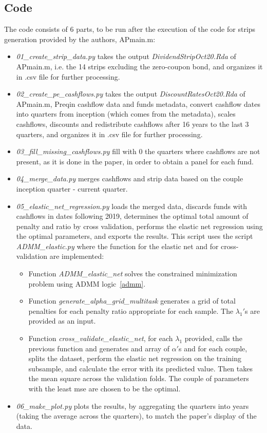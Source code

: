 \documentclass[12pt]{article}
\begin{document}
    \subsection{Code}
        The code consists of 6 parts, to be run after the execution of the code for strips generation provided by the authors, APmain.m:
        \begin{itemize}
            \item \textit{01\_create\_strip\_data.py} takes the output \textit{DividendStripOct20.Rda} of APmain.m, i.e. the 14 strips excluding the zero-coupon bond, and organizes it in .csv file for further processing.
            \item \textit{02\_create\_pe\_cashflows.py} takes the output \textit{DiscountRatesOct20.Rda} of APmain.m, Preqin cashflow data and funds metadata, convert cashflow dates into quarters from inception (which comes from the metadata), scales cashflows, discounts and redistribute cashflows after 16 years to the last 3 quarters, and organizes it in .csv file for further processing.
            \item \textit{03\_fill\_missing\_cashflows.py} fill with 0 the quarters where cashflows are not present, as it is done in the paper, in order to obtain a panel for each fund.
            \item \textit{04\_merge\_data.py} merges cashflows and strip data based on the couple inception quarter - current quarter.
            \item \textit{05\_elastic\_net\_regression.py} loads the merged data, discards funds with cashflows in dates following 2019, determines the optimal total amount of penalty and ratio by cross validation, performs the elastic net regression using the optimal parameters, and exports the results.
            This script uses the script \textit{ADMM\_elastic.py} where the function for the elastic net and for cross-validation are implemented:
            \begin{itemize}
                \item Function \textit{ADMM\_elastic\_net} solves the constrained minimization problem using ADMM logic~\ref{admm}.
                \item Function \textit{generate\_alpha\_grid\_multitask} generates a grid of total penalties for each penalty ratio appropriate for each sample.
                The $\lambda_1$\('\)s are provided as an input.
                \item Function \textit{cross\_validate\_elastic\_net}, for each $\lambda_1$ provided, calls the previous function and generates and array of $\alpha$\('\)s and for each couple, splits the dataset, perform the elastic net regression on the training subsample, and calculate the error with its predicted value.
                Then takes the mean square across the validation folds.
                The couple of parameters with the least mse are chosen to be the optimal.
            \end{itemize}
            \item \textit{06\_make\_plot.py} plots the results, by aggregating the quarters into years (taking the average across the quarters), to match the paper's display of the data.
        \end{itemize}
\end{document}
